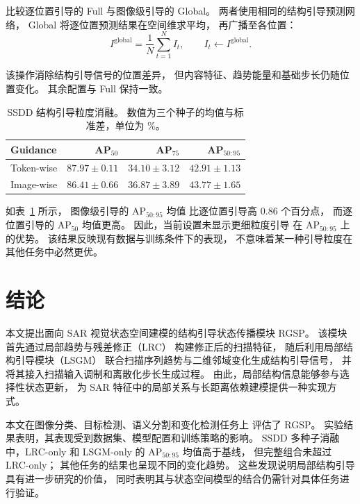 \documentclass[journal]{IEEEtran}
\begin{document}
比较逐位置引导的 Full 与图像级引导的 Global。
两者使用相同的结构引导预测网络，
Global 将逐位置预测结果在空间维求平均，
再广播至各位置：
\begin{equation}
I^{\mathrm{global}}
=
\frac{1}{N}\sum_{t=1}^{N}I_t,
\qquad
I_t \leftarrow I^{\mathrm{global}}.
\label{eq:global_guidance}
\end{equation}

该操作消除结构引导信号的位置差异，
但内容特征、趋势能量和基础步长仍随位置变化。
其余配置与 Full 保持一致。

\begin{table}[!t]
\centering
\small
\setlength{\tabcolsep}{4pt}
\caption{SSDD 结构引导粒度消融。
数值为三个种子的均值与标准差，单位为 \%。}
\label{tab:guidance_granularity}
\begin{tabular}{lrrr}
\toprule
Guidance & AP$_{50}$ & AP$_{75}$ & AP$_{50:95}$ \\
\midrule
Token-wise
& $87.97\pm0.11$ & $34.10\pm3.12$ & $42.91\pm1.13$ \\
Image-wise
& $86.41\pm0.66$ & $36.87\pm3.89$ & $43.77\pm1.65$ \\
\bottomrule
\end{tabular}
\end{table}

如表~\ref{tab:guidance_granularity} 所示，
图像级引导的 AP$_{50:95}$ 均值
比逐位置引导高 $0.86$ 个百分点，
而逐位置引导的 AP$_{50}$ 均值更高。
因此，当前设置未显示更细粒度引导
在 AP$_{50:95}$ 上的优势。
该结果反映现有数据与训练条件下的表现，
不意味着某一种引导粒度在其他任务中必然更优。
\section{结论}
\label{sec:conclusion}

本文提出面向 SAR 视觉状态空间建模的结构引导状态传播模块
RGSP。
该模块首先通过局部趋势与残差修正（LRC）
构建修正后的扫描特征，
随后利用局部结构引导模块（LSGM）
联合扫描序列趋势与二维邻域变化生成结构引导信号，
并将其接入扫描输入调制和离散化步长生成过程。
由此，局部结构信息能够参与选择性状态更新，
为 SAR 特征中的局部关系与长距离依赖建模提供一种实现方式。

本文在图像分类、目标检测、语义分割和变化检测任务上
评估了 RGSP。
实验结果表明，其表现受到数据集、模型配置和训练策略的影响。
SSDD 多种子消融中，LRC-only 和 LSGM-only 的
AP$_{50:95}$ 均值高于基线，
但完整组合未超过 LRC-only；
其他任务的结果也呈现不同的变化趋势。
这些发现说明局部结构引导具有进一步研究的价值，
同时表明其与状态空间模型的结合仍需针对具体任务进行验证。
\end{document}
